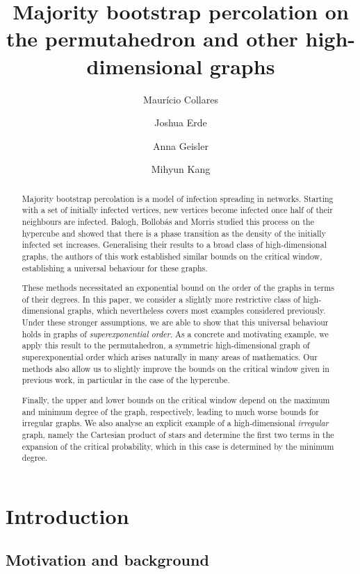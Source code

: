 \documentclass[reqno,a4paper,11pt]{amsart}
\title{Majority bootstrap percolation on the permutahedron and other high-dimensional graphs}
\author{Maur\'icio Collares \and Joshua Erde \and Anna Geisler \and Mihyun Kang}
\theoremstyle{definition}
\begin{document}
\begin{abstract}
Majority bootstrap percolation is a model of infection spreading in networks. Starting with a set of initially infected vertices, new vertices become infected once half of their neighbours are infected. Balogh, Bollob\'{a}s and Morris studied this process on the hypercube and showed that there is a phase transition as the density of the initially infected set increases. Generalising their results to a broad class of high-dimensional graphs, the authors of this work established similar bounds on the critical window, establishing a universal behaviour for these graphs.

These methods necessitated an exponential bound on the order of the graphs in terms of their degrees. In this paper, we consider a slightly more restrictive class of high-dimensional graphs, which nevertheless covers most examples considered previously. Under these stronger assumptions, we are able to show that this universal behaviour holds in graphs of \emph{superexponential order}. As a concrete and motivating example, we apply this result to the permutahedron, a symmetric high-dimensional graph of superexponential order which arises naturally in many areas of mathematics. Our methods also allow us to slightly improve the bounds on the critical window given in previous work, in particular in the case of the hypercube.

Finally, the upper and lower bounds on the critical window depend on the maximum and minimum degree of the graph, respectively, leading to much worse bounds for irregular graphs. We also analyse an explicit example of a high-dimensional \emph{irregular} graph, namely the Cartesian product of stars and determine the first two terms in the expansion of the critical probability, which in this case is determined by the minimum degree.
\end{abstract}
\maketitle

\section{Introduction}

\subsection{Motivation and background}
\end{document}
